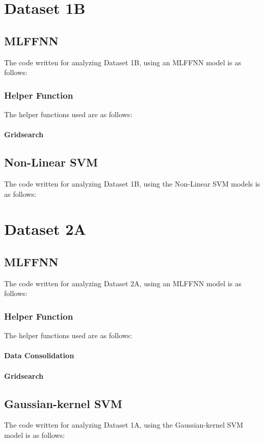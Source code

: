 \documentclass[11pt,a4paper]{article}
\begin{document}
\section{Dataset 1B}
\subsection{MLFFNN}
The code written for analyzing Dataset 1B, using an MLFFNN model is as follows:\vspace{-1em}


\subsubsection{Helper Function}
The helper functions used are as follows:\vspace{-1em}
\paragraph{Gridsearch}
\vspace{-1.5em}


\subsection{Non-Linear SVM}
The code written for analyzing Dataset 1B, using the Non-Linear SVM models is as follows:\vspace{-1em}


\section{Dataset 2A}
\subsection{MLFFNN}
The code written for analyzing Dataset 2A, using an MLFFNN model is as follows:\vspace{-1em}


\subsubsection{Helper Function}
The helper functions used are as follows:\vspace{-1em}
\paragraph{Data Consolidation}
\vspace{-1.5em}

\paragraph{Gridsearch}
\vspace{-1.5em}



\subsection{Gaussian-kernel SVM}
The code written for analyzing Dataset 1A, using the Gaussian-kernel SVM model is as follows:\vspace{-1em}

\end{document}
